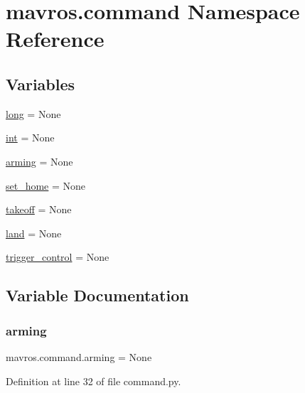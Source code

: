 \hypertarget{namespacemavros_1_1command}{}\section{mavros.\+command Namespace Reference}
\label{namespacemavros_1_1command}
\subsection*{Variables}
\begin{DoxyCompactItemize}
\item 
\mbox{\hyperlink{namespacemavros_1_1command_ab1ee926a18965a47197025dbd848a94f}{long}} = None
\item 
\mbox{\hyperlink{namespacemavros_1_1command_ac1f680b3bb9f3fba25060a74e359f227}{int}} = None
\item 
\mbox{\hyperlink{namespacemavros_1_1command_a159c4b4383c4e106d2a16b29b9e03c5a}{arming}} = None
\item 
\mbox{\hyperlink{namespacemavros_1_1command_a3d8940807add4a6404444a10487f495e}{set\+\_\+home}} = None
\item 
\mbox{\hyperlink{namespacemavros_1_1command_a6b82958fd69f04189eb9b660bb9e6c23}{takeoff}} = None
\item 
\mbox{\hyperlink{namespacemavros_1_1command_a152c5ce6a5eca869b98d2ccb8086d685}{land}} = None
\item 
\mbox{\hyperlink{namespacemavros_1_1command_a999576761867356758c2dce4f335bc7d}{trigger\+\_\+control}} = None
\end{DoxyCompactItemize}


\subsection{Variable Documentation}
\mbox{\label{namespacemavros_1_1command_a159c4b4383c4e106d2a16b29b9e03c5a}} 
\subsubsection{\texorpdfstring{arming}{arming}}
{\footnotesize\ttfamily mavros.\+command.\+arming = None}



Definition at line 32 of file command.\+py.

\mbox{\label{namespacemavros_1_1command_ac1f680b3bb9f3fba25060a74e359f227}} 
